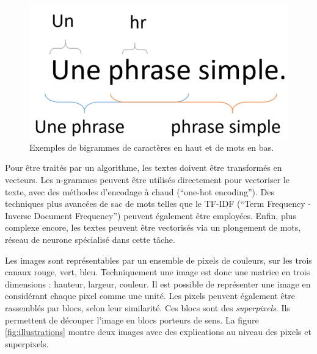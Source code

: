 \begin{figure}[htpb!]
    \centering
    \includegraphics[scale=0.50]{Introduction/figures/n-gramm.png}
    \caption{Exemples de bigrammes de caractères en haut et de mots en bas.}
    \label{fig:n-gramms}
\end{figure}

Pour être traités par un algorithme, les textes doivent être transformés en vecteurs. Les n-grammes peuvent être utilisés directement pour vectoriser le texte, avec des méthodes d'encodage à chaud (``one-hot encoding''). Des techniques plus avancées de sac de mots telles que le TF-IDF (``Term Frequency - Inverse Document Frequency'') peuvent également être employées. Enfin, plus complexe encore, les textes peuvent être vectorisés via un plongement de mots, réseau de neurone spécialisé dans cette tâche.

Les images sont représentables par un ensemble de pixels de couleurs, sur les trois canaux rouge, vert, bleu. Techniquement une image est donc une matrice en trois dimensions : hauteur, largeur, couleur. Il est possible de représenter une image en considérant chaque pixel comme une unité. Les pixels peuvent également être rassemblés par blocs, selon leur similarité. Ces blocs sont des \textit{superpixels}. Ils permettent de découper l'image en blocs porteurs de sens. La figure \ref{fig:illustrations} montre deux images avec des explications au niveau des pixels et superpixels.

